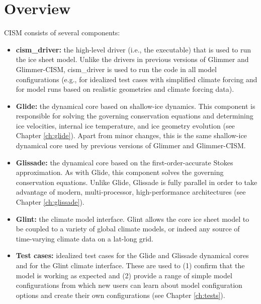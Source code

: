 \section{Overview}
%
CISM consists of several components:
%
\begin{itemize}

\item {\bf cism\_driver:} the high-level driver (i.e., the executable) that 
is used to run the ice sheet model. Unlike the drivers in previous versions of Glimmer and Glimmer-CISM, 
cism\_driver is used to run the code in all model configurations 
(e.g., for idealized test cases with simplified climate forcing and for model runs 
based on realistic geometries and climate forcing data).  

\item {\bf Glide:} the dynamical core based on shallow-ice dynamics. 
This component is responsible for solving the governing conservation equations and 
determining ice velocities, internal ice temperature, 
and ice geometry evolution (see Chapter \ref{ch:glide}). 
Apart from minor changes, this is the same shallow-ice dynamical core 
used by previous versions of Glimmer and Glimmer-CISM.

\item {\bf Glissade:} the dynamical core based on the first-order-accurate Stokes approximation. As with Glide, this component solves the governing conservation equations. Unlike Glide, Glissade is fully parallel in order to take advantage of modern, multi-processor, high-performance architectures (see Chapter \ref{ch:glissade}).

\item {\bf Glint:} the climate model interface. Glint allows the core ice sheet model to be coupled to a variety of 
global climate models, or indeed any source of time-varying climate data on a lat-long grid. 

\item {\bf Test cases:} idealized test cases for the Glide and Glissade dynamical cores 
and for the Glint climate interface. These are used to (1) confirm that the model 
is working as expected and (2) provide a range of simple model configurations 
from which new users can learn about model configuration options and 
create their own configurations (see Chapter \ref{ch:tests}). 


\end{itemize}
